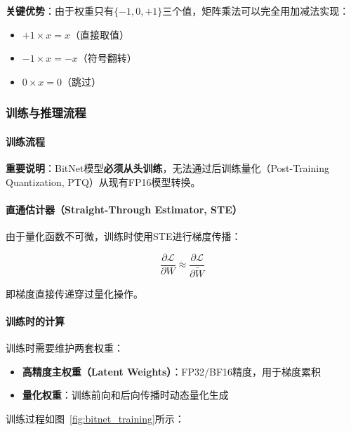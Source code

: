 \documentclass[12pt,a4paper]{article}
\begin{document}
\textbf{关键优势}：由于权重只有$\{-1, 0, +1\}$三个值，矩阵乘法可以完全用加减法实现：
\begin{itemize}
    \item $+1 \times x = x$（直接取值）
    \item $-1 \times x = -x$（符号翻转）
    \item $0 \times x = 0$（跳过）
\end{itemize}

\subsubsection{训练与推理流程}

\paragraph{训练流程}

\textbf{重要说明}：BitNet模型\textbf{必须从头训练}，无法通过后训练量化（Post-Training Quantization, PTQ）从现有FP16模型转换。

\paragraph{直通估计器（Straight-Through Estimator, STE）}

由于量化函数不可微，训练时使用STE进行梯度传播：

\begin{equation}
\frac{\partial \mathcal{L}}{\partial W} \approx \frac{\partial \mathcal{L}}{\partial \tilde{W}}
\end{equation}

即梯度直接传递穿过量化操作。

\paragraph{训练时的计算}

训练时需要维护两套权重：
\begin{itemize}
    \item \textbf{高精度主权重（Latent Weights）}：FP32/BF16精度，用于梯度累积
    \item \textbf{量化权重}：训练前向和后向传播时动态量化生成
\end{itemize}

训练过程如图~\ref{fig:bitnet_training}所示：
\end{document}
